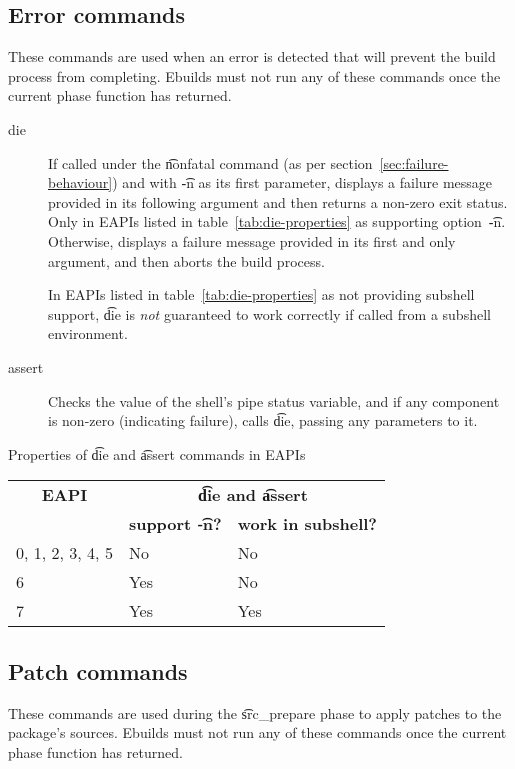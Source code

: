 \subsection{Error commands}
These commands are used when an error is detected that will prevent the build process from
completing. Ebuilds must not run any of these commands once the current phase function has returned.
\begin{description}
\item[die]  If called under the \t{nonfatal} command (as per
    section~\ref{sec:failure-behaviour}) and with \t{-n} as its first parameter, displays a failure
    message provided in its following argument and then returns a non-zero exit status. Only in
    EAPIs listed in table~\ref{tab:die-properties} as supporting option~\t{-n}. Otherwise, displays
    a failure message provided in its first and only argument, and then aborts the build process.

     In EAPIs listed in table~\ref{tab:die-properties} as not providing
    subshell support, \t{die} is \emph{not} guaranteed to work correctly if called from a subshell
    environment.
\item[assert] Checks the value of the shell's pipe status variable, and if any component is non-zero
    (indicating failure), calls \t{die}, passing any parameters to it.
\end{description}

\begin{centertable}{Properties of \t{die} and \t{assert} commands in EAPIs}
    \label{tab:die-properties}
    \begin{tabular}{lll}
      \toprule
      \multicolumn{1}{c}{\textbf{EAPI}} &
      \multicolumn{2}{c}{\textbf{\t{die} and \t{assert}}} \\
      &
      \multicolumn{1}{c}{\textbf{support \t{-n}?}} &
      \multicolumn{1}{c}{\textbf{work in subshell?}} \\
      \midrule
      0, 1, 2, 3, 4, 5  & No  & No  \\
      6                 & Yes & No  \\
      7                 & Yes & Yes \\
      \bottomrule
    \end{tabular}
\end{centertable}

\subsection{Patch commands}
These commands are used during the \t{src_prepare} phase to apply patches to the package's sources.
Ebuilds must not run any of these commands once the current phase function has returned.


